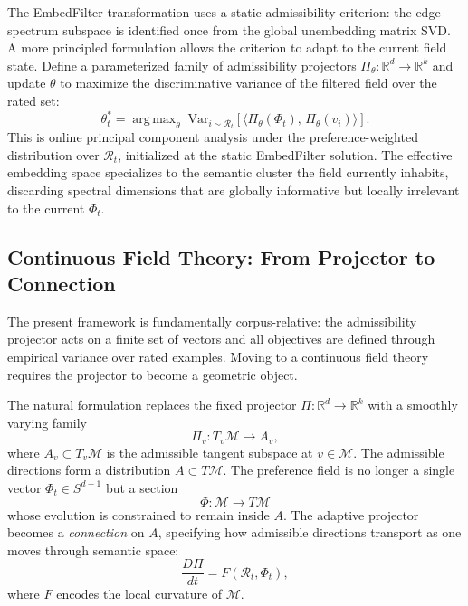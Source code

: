 \documentclass[12pt, a4paper]{article}
\DeclareMathOperator*{\argmax}{arg\,max}
\theoremstyle{plain}
\theoremstyle{definition}
\begin{document}
The EmbedFilter transformation uses a static admissibility criterion: the
edge-spectrum subspace is identified once from the global unembedding matrix
SVD. A more principled formulation allows the criterion to adapt to the
current field state. Define a parameterized family of admissibility
projectors $\Pi_\theta : \mathbb{R}^d \to \mathbb{R}^k$ and update $\theta$
to maximize the discriminative variance of the filtered field over the rated
set:
\begin{equation}
  \theta_t^* = \argmax_{\theta}\;
  \mathrm{Var}_{i \sim \mathcal{R}_t}\!\left[
  \langle \Pi_\theta(\Phi_t),\, \Pi_\theta(v_i) \rangle \right].
\end{equation}
This is online principal component analysis under the preference-weighted
distribution over $\mathcal{R}_t$, initialized at the static EmbedFilter
solution. The effective embedding space specializes to the semantic cluster
the field currently inhabits, discarding spectral dimensions that are
globally informative but locally irrelevant to the current $\Phi_t$.

\subsection{Continuous Field Theory: From Projector to Connection}

The present framework is fundamentally corpus-relative: the admissibility
projector acts on a finite set of vectors and all objectives are defined
through empirical variance over rated examples. Moving to a continuous
field theory requires the projector to become a geometric object.

The natural formulation replaces the fixed projector $\Pi : \mathbb{R}^d
\to \mathbb{R}^k$ with a smoothly varying family
\begin{equation}
  \Pi_v : T_v\mathcal{M} \to A_v,
\end{equation}
where $A_v \subset T_v\mathcal{M}$ is the admissible tangent subspace at
$v \in \mathcal{M}$. The admissible directions form a distribution $A
\subset T\mathcal{M}$. The preference field is no longer a single vector
$\Phi_t \in S^{d-1}$ but a section
\begin{equation}
  \Phi : \mathcal{M} \to T\mathcal{M}
\end{equation}
whose evolution is constrained to remain inside $A$. The adaptive projector
becomes a \textit{connection} on $A$, specifying how admissible directions
transport as one moves through semantic space:
\begin{equation}
  \frac{D\Pi}{dt} = F(\mathcal{R}_t, \Phi_t),
\end{equation}
where $F$ encodes the local curvature of $\mathcal{M}$.
\end{document}
